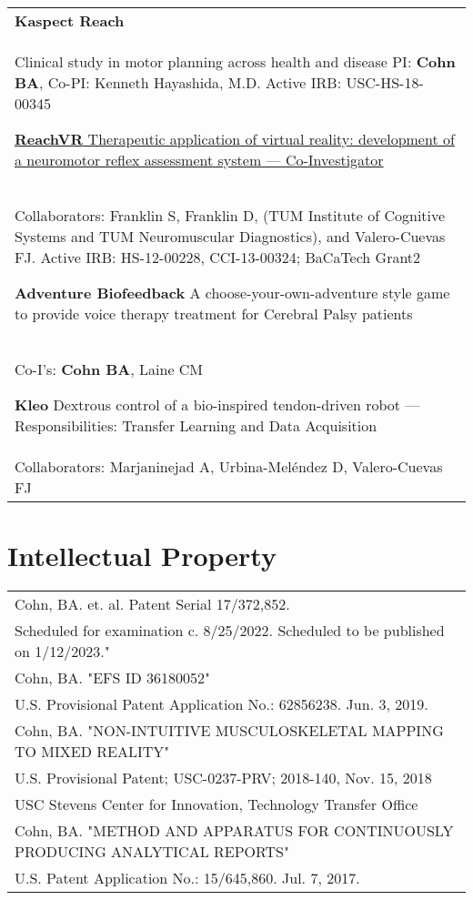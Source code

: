 \documentclass[10pt,a4paper]{article}
\begin{document}
  \vspace*{1mm}
  \begin{tabularx}{17cm}{X}
  \textbf{Kaspect Reach} \\
  Clinical study in motor planning across health and disease
  PI: \textbf{Cohn BA}, Co-PI: Kenneth Hayashida, M.D.
  Active IRB: USC-HS-18-00345

  \vspace*{3mm}
  \href{http://www.bacatec.de/en/gefoerderte_projekte.html}{\textbf{ReachVR} Therapeutic application of virtual reality: development of a neuromotor reflex assessment system --- Co-Investigator}\\
  Collaborators: Franklin S, Franklin D, (TUM Institute of Cognitive Systems and TUM Neuromuscular Diagnostics), and Valero-Cuevas FJ.
  Active IRB: HS-12-00228, CCI-13-00324; BaCaTech Grant2

  \vspace*{3mm}
  \textbf{Adventure Biofeedback} A choose-your-own-adventure style game to provide voice therapy treatment for Cerebral Palsy patients \\
  Co-I's: \textbf{Cohn BA}, Laine CM

  \vspace*{3mm}
  \textbf{Kleo} Dextrous control of a bio-inspired tendon-driven robot --- Responsibilities: Transfer Learning and Data Acquisition\\
  Collaborators: Marjaninejad A, Urbina-Mel\'{e}ndez D, Valero-Cuevas FJ

  \end{tabularx}


\vspace*{3mm}\section*{Intellectual Property}

  \vspace*{1mm}
  \begin{tabularx}{17cm}{X}

Cohn, BA. et. al. Patent Serial 17/372,852.\\
Scheduled for examination c. 8/25/2022. Scheduled to be published on 1/12/2023."\\[2mm]


Cohn, BA. "EFS ID 36180052"\\
 U.S. Provisional Patent Application No.: 62856238. Jun. 3, 2019.\\[2mm]

Cohn, BA. "NON-INTUITIVE MUSCULOSKELETAL MAPPING TO MIXED REALITY"\\
 U.S. Provisional Patent; USC-0237-PRV; 2018-140, Nov. 15, 2018\\
 USC Stevens Center for Innovation, Technology Transfer Office\\[2mm]

 Cohn, BA. "METHOD AND APPARATUS FOR CONTINUOUSLY PRODUCING ANALYTICAL REPORTS"\\
 U.S. Patent Application No.: 15/645,860. Jul. 7, 2017.\\[2mm]


  \end{tabularx}
\end{document}
